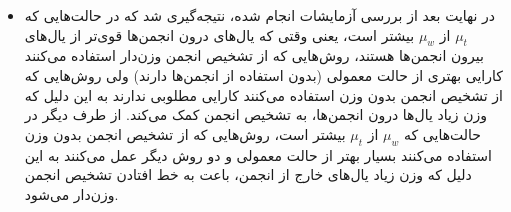 \begin{itemize}
    \item در نهایت بعد از بررسی آزمایشات انجام شده، نتیجه‌گیری شد که در حالت‌هایی که $\mu_t$ از $\mu_w$ بیشتر است، یعنی وقتی که یال‌های درون انجمن‌ها قوی‌تر از یال‌های بیرون انجمن‌ها هستند، روش‌هایی که از تشخیص انجمن وزن‌دار استفاده می‌کنند کارایی بهتری از حالت معمولی (بدون استفاده از انجمن‌ها دارند) ولی روش‌هایی که از تشخیص انجمن بدون وزن استفاده می‌کنند کارایی مطلوبی ندارند به این دلیل که وزن زیاد یال‌ها درون انجمن‌ها، به تشخیص انجمن کمک می‌کند. از طرف دیگر در حالت‌هایی که $\mu_w$ از $\mu_t$ بیشتر است، روش‌هایی که از تشخیص انجمن بدون وزن استفاده می‌کنند بسیار بهتر از حالت معمولی و دو روش دیگر عمل می‌کنند به این دلیل که وزن زیاد یال‌های خارج از انجمن، باعت به خط افتادن تشخیص انجمن وزن‌دار می‌شود.    
\end{itemize}
